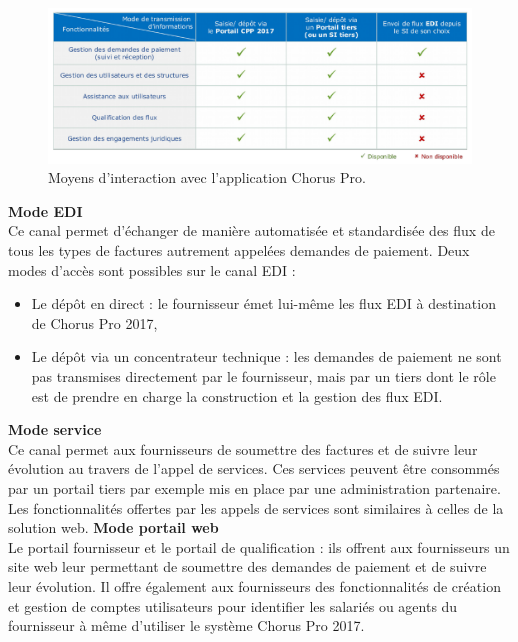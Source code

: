 \documentclass[12pt,a4paper]{article}
\begin{document}
\begin{figure}[H]
	\begin{center}
		\includegraphics[width=\textwidth,height=\textheight,keepaspectratio]{tableauMoyensFonctionnalites.png}
		\caption{Moyens d'interaction avec l'application Chorus Pro.}
		\label{tableauMoyens}
	\end{center}
\end{figure}
\textbf{Mode EDI}
~~\\
Ce canal permet d’échanger de manière automatisée et standardisée des flux de tous les types de factures autrement appelées demandes de paiement. Deux modes d’accès sont possibles sur le canal EDI :
\begin{itemize}
\item Le dépôt en direct : le fournisseur émet lui-même les flux EDI à destination de Chorus Pro 2017,
\item Le dépôt via un concentrateur technique : les demandes de paiement ne sont pas transmises directement par le fournisseur, mais par un tiers dont le rôle est de prendre en charge la construction et la gestion des flux EDI. 
\end{itemize}
\smallbreak
\textbf{Mode service}
~~\\
Ce canal permet aux fournisseurs de soumettre des factures et de suivre leur évolution au travers de l'appel de services. Ces services peuvent être consommés par un portail tiers par exemple mis en place par une administration partenaire. Les fonctionnalités offertes par les appels de services sont similaires à celles de la solution web.
\smallbreak
\textbf{Mode portail web}
~~\\
Le portail fournisseur et le portail de qualification : ils offrent aux fournisseurs un site web leur permettant de soumettre des demandes de paiement et de suivre leur évolution. Il offre également aux fournisseurs des fonctionnalités de création et gestion de comptes utilisateurs pour identifier les salariés ou agents du fournisseur à même d’utiliser le système Chorus Pro 2017.
\end{document}
